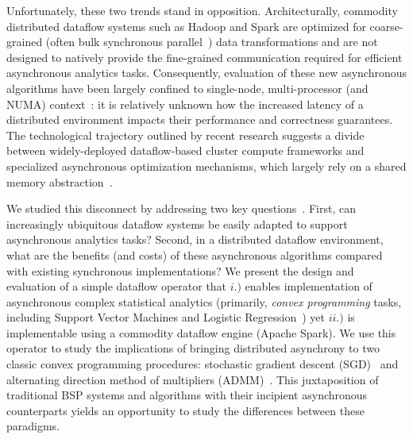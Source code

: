 
Unfortunately, these two trends stand in opposition. Architecturally,
commodity distributed dataflow systems such as Hadoop and Spark are
optimized for coarse-grained (often bulk synchronous
parallel~\cite{valiant-bsp}) data transformations and are not designed
to natively provide the fine-grained communication required for
efficient asynchronous analytics tasks. Consequently, evaluation of
these new asynchronous algorithms have been largely confined to
single-node, multi-processor (and NUMA)
context~\cite{dimmwitted,hogwild}: it is relatively unknown how the
increased latency of a distributed environment impacts their
performance and correctness guarantees. The technological trajectory
outlined by recent research suggests a divide between
widely-deployed dataflow-based cluster compute frameworks and
specialized asynchronous optimization mechanisms, which largely rely
on a shared memory abstraction~\cite{parameter-server,stale-parameter,yahoo-lda}.



We studied this disconnect by addressing two key
questions~\cite{admm}.  First, can increasingly ubiquitous dataflow systems be
easily adapted to support asynchronous analytics tasks?  Second, in a
distributed dataflow environment, what are the benefits (and costs) of
these asynchronous algorithms compared with existing synchronous
implementations?  We present the design and evaluation of a simple
dataflow operator that $i.)$ enables implementation of asynchronous
complex statistical analytics (primarily, \textit{convex programming}
tasks, including Support Vector Machines and Logistic
Regression~\cite{boyd-book}) yet $ii.)$ is implementable using a
commodity dataflow engine (Apache Spark). We use this operator to
study the implications of bringing distributed asynchrony to two
classic convex programming procedures: stochastic gradient descent
(SGD)~\cite{boyd-book} and alternating direction method of multipliers
(ADMM)~\cite{boyd-admm}. This juxtaposition of traditional BSP systems
and algorithms with their incipient asynchronous counterparts yields
an opportunity to study the differences between these paradigms.


